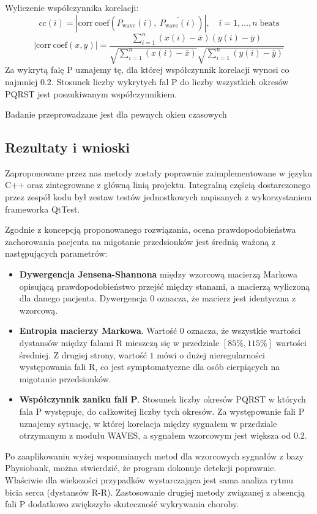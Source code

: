 Wyliczenie współczynnika korelacji:
\begin{equation}
cc(i) = |\mathrm{corr\:coef}(P_\mathrm{wave}(i),\: \overline{P_\mathrm{wave}(i)})|, \quad i = 1,\ldots,n\; \mathrm{beats}
\end{equation}
\begin{equation}
  |\mathrm{corr\:coef}(x,y)| = 
  \frac
      {\sum_{i=1}^{n}(x(i) - \overline{x})(y(i) - \overline{y})}
      {
        \sqrt{\sum_{i=1}^{n}(x(i) - \overline{x})}
        \sqrt{\sum_{i=1}^{n}(y(i) - \overline{y})}
      }
\end{equation}
Za wykrytą falę P uznajemy tę, dla której współczynnik korelacji wynosi co najmniej $0.2$.
Stosunek liczby wykrytych fal P do liczby wszystkich okresów PQRST jest poszukiwanym współczynnikiem.

Badanie przeprowadzane jest dla pewnych okien czasowych

\subsection{Rezultaty i wnioski}
Zaproponowane przez nas metody zostały poprawnie zaimplementowane w języku C++ oraz zintegrowane z główną linią projektu.
Integralną częścią dostarczonego przez zespół kodu był zestaw testów jednostkowych napisanych 
z wykorzystaniem frameworka QtTest.

Zgodnie z koncepcją proponowanego rozwiązania, ocena prawdopodobieństwa zachorowania pacjenta na migotanie przedsionków
jest średnią ważoną z następujących parametrów:
\begin{itemize}
 \item \textbf{Dywergencja Jensena-Shannona} między wzorcową macierzą Markowa opisującą prawdopodobieństwo przejść między stanami,
 a macierzą wyliczoną dla danego pacjenta. 
 Dywergencja $0$ oznacza, że macierz jest identyczna z wzorcową. 
 
 \item \textbf{Entropia macierzy Markowa}.
 Wartość $0$ oznacza, że wszystkie wartości dystansów między falami R mieszczą się w przedziale $[85\%,115\%]$ wartości średniej.
 Z drugiej strony, wartość $1$ mówi o dużej nieregularności występowania fali R, 
 co jest symptomatyczne dla osób cierpiących na migotanie przedsionków.
 
 \item \textbf{Współczynnik zaniku fali P}. 
 Stosunek liczby okresów PQRST w których fala P występuje, do całkowitej liczby tych okresów.
 Za występowanie fali P uznajemy sytuację, w której korelacja między sygnałem w przedziale otrzymanym z modułu WAVES,
 a sygnałem wzorcowym jest większa od $0.2$.
 
\end{itemize}
Po zaaplikowaniu wyżej wspomnianych metod dla wzorcowych sygnałów z bazy Physiobank, 
można stwierdzić, że program dokonuje detekcji poprawnie. 
Właściwie dla wiekszości przypadków wystarczająca jest sama analiza rytmu bicia serca (dystansów R-R).
Zastosowanie drugiej metody związanej z absencją fali P dodatkowo zwiększyło skuteczność wykrywania choroby.

